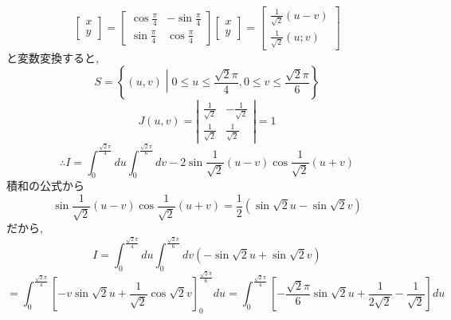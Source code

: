 \documentclass[a4paper,10pt,report]{amsart}
\theoremstyle{plain}
\theoremstyle{definition}
\theoremstyle{remark}
\begin{document}
\begin{enumerate}
\begin{equation*}
\begin{bmatrix}
                x\\
                y
            \end{bmatrix}
            =\begin{bmatrix}
                \cos{\frac{\pi}{4}} & -\sin{\frac{\pi}{4}}\\
                \sin{\frac{\pi}{4}} & \cos{\frac{\pi}{4}}
            \end{bmatrix}
            \begin{bmatrix}
                x\\
                y
            \end{bmatrix}
            =\begin{bmatrix}
                \frac{1}{\sqrt{2}}(u-v)\\
                \frac{1}{\sqrt{2}}(u;v)
            \end{bmatrix}
        \end{equation*}
        と変数変換すると, 
        \begin{equation*}
            S=\left\{(u,v)\middle| 0\leq u\leq\frac{\sqrt{2}\pi}{4},0\leq v\leq \frac{\sqrt{2}\pi}{6}\right\}
        \end{equation*}
        \begin{equation*}
            J(u,v)=\left|\begin{array}{cc}
                \frac{1}{\sqrt{2}} & -\frac{1}{\sqrt{2}}\\
                \frac{1}{\sqrt{2}} & \frac{1}{\sqrt{2}}
            \end{array}\right|=1
        \end{equation*}
        \begin{equation*}
            \therefore I=\int_{0}^{\frac{\sqrt{2}\pi}{4}}du\int_{0}^{\frac{\sqrt{2}\pi}{6}}dv-2\sin{\frac{1}{\sqrt{2}}(u-v)}\cos{\frac{1}{\sqrt{2}}(u+v)}
        \end{equation*}
        積和の公式から
        \begin{equation*}
            \sin{\frac{1}{\sqrt{2}}(u-v)}\cos{\frac{1}{\sqrt{2}}(u+v)}=\frac{1}{2}(\sin{\sqrt{2}u}-\sin{\sqrt{2}v})
        \end{equation*}
        だから,
        \begin{equation*}
            I=\int_{0}^{\frac{\sqrt{2}\pi}{4}}du\int_{0}^{\frac{\sqrt{2}\pi}{6}}dv(-\sin{\sqrt{2}u}+\sin{\sqrt{2}v})
        \end{equation*}
        \begin{equation*}
            =\int_{0}^{\frac{\sqrt{2}\pi}{4}}{\left[-v\sin{\sqrt{2}u}+\frac{1}{\sqrt{2}}\cos{\sqrt{2}v}\right]}_{0}^{\frac{\sqrt{2}\pi}{6}}du=\int_{0}^{\frac{\sqrt{2}\pi}{4}}{\left[-\frac{\sqrt{2}\pi}{6}\sin{\sqrt{2}u}+\frac{1}{2\sqrt{2}}-\frac{1}{\sqrt{2}}\right]}du

\end{equation*}
\end{enumerate}
\end{document}

